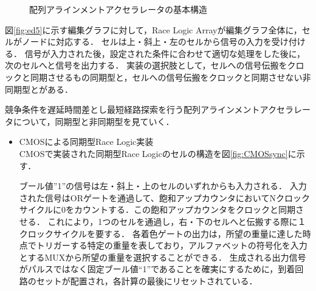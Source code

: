 \begin{figure}[t!]
\begin{center}
\caption{配列アラインメントアクセラレータの基本構造}
\label{fig:racelogicarray}
\end{center}
\end{figure}
図\ref{fig:ed5}に示す編集グラフに対して，Race Logic Arrayが編集グラフ全体に，セルがノードに対応する．
セルは上・斜上・左のセルから信号の入力を受け付ける．
信号が入力された後，設定された条件に合わせて適切な処理をした後に，
次のセルへと信号を出力する．
実装の選択肢として，セルへの信号伝搬をクロックと同期させるもの同期型と，セルへの信号伝搬をクロックと同期させない非同期型とがある．

競争条件を遅延時間差とし最短経路探索を行う配列アラインメントアクセラレータについて，同期型と非同期型を見ていく．

\begin{itemize}
\item CMOSによる同期型Race Logic実装\\
CMOSで実装された同期型Race Logicのセルの構造を図\ref{fig:CMOSsync}に示す．

ブール値”1”の信号は左・斜上・上のセルのいずれからも入力される．
入力された信号はORゲートを通過して、飽和アップカウンタにおいてNクロックサイクルに0をカウントする．この飽和アップカウンタをクロックと同期させる．
これにより，1つのセルを通過し，右・下のセルへと伝搬する際に１クロックサイクルを要する．
各着色ゲートの出力は，所望の重量に達した時点でトリガーする特定の重量を表しており，アルファベットの符号化を入力とするMUXから所望の重量を選択することができる．
生成される出力信号がパルスではなく固定ブール値“1”であることを確実にするために，到着回路のセットが配置され，各計算の最後にリセットされている．


\end{itemize}

